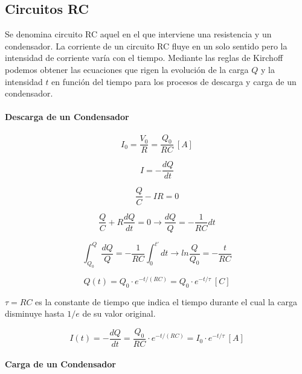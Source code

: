 \documentclass{tufte-handout}
\begin{document}
\subsection{Circuitos RC}

Se denomina circuito RC aquel en el que interviene una resistencia y un condensador. La corriente de un circuito RC fluye en un solo sentido pero la intensidad de corriente varía con el tiempo. Mediante las reglas de Kirchoff podemos obtener las ecuaciones que rigen la evolución de la carga $Q$ y la intensidad $t$ en función del tiempo para los procesos de descarga y carga de un condensador.

\paragraph{Descarga de un Condensador}

\begin{equation}
I_0 = \frac{V_0}{R} = \frac{Q_0}{RC}~[A]
\end{equation}

\begin{equation}
I = -\frac{dQ}{dt}
\end{equation}

\begin{equation}
\frac{Q}{C}-IR = 0
\end{equation}

\begin{equation}
\frac{Q}{C}+R\frac{dQ}{dt} = 0 \rightarrow \frac{dQ}{Q} = -\frac{1}{RC}dt
\end{equation}

\begin{equation}
\int_{Q_0}^{Q} \frac{dQ}{Q} = -\frac{1}{RC}\int_0^{t'}dt \rightarrow ln\frac{Q}{Q_0} = -\frac{t}{RC}
\end{equation}

\begin{equation}
Q(t) = Q_0 \cdot e^{-t/(RC)} = Q_0\cdot e^{-t/\tau}~[C]
\end{equation}

$\tau = RC$ es la constante de tiempo que indica el tiempo durante el cual la carga disminuye hasta $1/e$ de su valor original.

\begin{equation}
I(t) = -\frac{dQ}{dt} = \frac{Q_0}{RC}\cdot e^{-t/(RC)} = I_0\cdot e^{-t/\tau}~[A]
\end{equation}

\paragraph{Carga de un Condensador}
\end{document}
